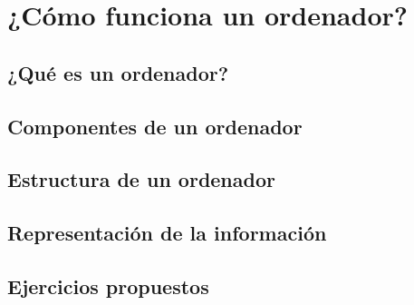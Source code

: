 
\chapter{¿Cómo funciona un ordenador?}

\section{¿Qué es un ordenador?}

\section{Componentes de un ordenador}

\section{Estructura de un ordenador}

\section{Representación de la información}

\section{Ejercicios propuestos}

